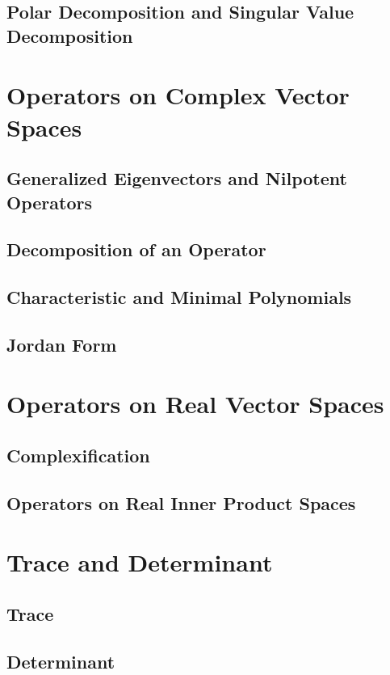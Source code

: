 \documentclass{article}
\begin{document}
\subsection{Polar Decomposition and Singular Value Decomposition}


\section{Operators on Complex Vector Spaces}
\subsection{Generalized Eigenvectors and Nilpotent Operators}

\subsection{Decomposition of an Operator}

\subsection{Characteristic and Minimal Polynomials}

\subsection{Jordan Form}


\section{Operators on Real Vector Spaces}
\subsection{Complexification}

\subsection{Operators on Real Inner Product Spaces}


\section{Trace and Determinant}
\subsection{Trace}

\subsection{Determinant}
\end{document}
